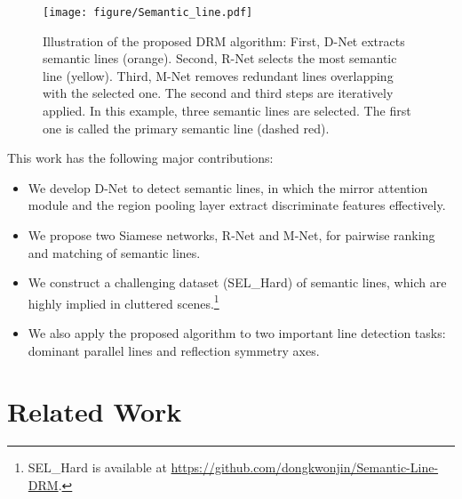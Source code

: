 \documentclass[runningheads]{llncs}
\begin{document}
\begin{figure*}[t]

  \centering
  \texttt{[image: figure/Semantic\_line.pdf]}\\[-5pt]

  \caption{Illustration of the proposed DRM algorithm: First, D-Net extracts semantic lines (orange). Second, R-Net selects the most semantic line (yellow). Third, M-Net removes redundant lines overlapping with the selected one. The second and third steps are iteratively applied. In this example, three semantic lines are selected. The first one is called the primary semantic line (dashed red).}
  \label{fig:semantic_line_fig}

\end{figure*}


This work has the following major contributions:

\begin{itemize}
\item We develop D-Net to detect semantic lines, in which the mirror attention module and the region pooling layer extract discriminate features effectively.
\item We propose two Siamese networks, R-Net and M-Net, for pairwise ranking and matching of semantic lines.
\item We construct a challenging dataset (SEL\_Hard) of semantic lines, which are highly implied in cluttered scenes.\footnote{SEL\_Hard is available at \href{https://github.com/dongkwonjin/Semantic-Line-DRM}{https://github.com/dongkwonjin/Semantic-Line-DRM}.}
\item We also apply the proposed algorithm to two important line detection tasks: dominant parallel lines and reflection symmetry axes.
\end{itemize}

\section{Related Work}
\end{document}

